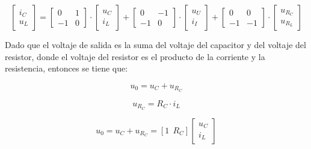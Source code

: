 \vspace{-0.5cm}
\begin{equation}
    \begin{bmatrix}
        i_C \\
        u_L
    \end{bmatrix}
    =
    \begin{bmatrix}
        0 & 1 \\
        -1 & 0
    \end{bmatrix}
    \cdot
    \begin{bmatrix}
        u_C \\
        i_L
    \end{bmatrix}
    +
    \begin{bmatrix}
        0 & -1 \\
        -1 & 0
    \end{bmatrix}
    \cdot
    \begin{bmatrix}
        u_U \\
        i_I
    \end{bmatrix}
    +
    \begin{bmatrix}
        0 & 0 \\
        -1 & -1
    \end{bmatrix}
    \cdot
    \begin{bmatrix}
        u_{R_C} \\
        u_{R_L}
    \end{bmatrix}
\end{equation}

Dado que el voltaje de salida es la suma del voltaje del capacitor y del voltaje del resistor, 
donde el voltaje del resistor es el producto de la corriente y la resistencia, entonces se tiene que:

\vspace{-0.75cm}
\begin{equation}
    u_0 = u_C + u_{R_C}
\end{equation}
\vspace{-0.75cm}

\vspace{-0.75cm}
\begin{equation}
    u_{R_C} = R_C \cdot i_L
\end{equation}
\vspace{-0.75cm}


\begin{equation}
    u_0 = u_C + u_{R_C} = [1 \ \ R_C] 
    \begin{bmatrix}
        u_C \\
        i_L
    \end{bmatrix}
\end{equation}
\vspace{-0.5cm}



